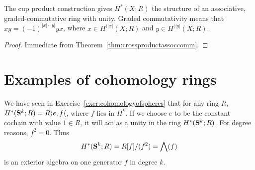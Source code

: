 \documentclass[a4paper,openany]{scrbook}
\begin{document}
\begin{corollary}\label{cor:cupproduct}
The cup product construction gives $H^*(X;R)$ the structure of an associative, graded-commutative ring with unity. Graded commutativity means that $xy=(-1)^{|x|\cdot|y|}yx$, where $x \in H^{(|x|}(X;R)$ and $y \in H^{(|y|}(X;R)$.
\end{corollary}
\begin{proof}
Immediate from Theorem~\ref{thm:crossproductassoccomm}.
\end{proof}

\section{Examples of cohomology rings}

\begin{example}\label{ex:cohomologyringofspheres}
We have seen in Exercise~\ref{exer:cohomologyofspheres} that for any ring $R$, $H^*(\S^k;R) = R\rangle e,f\langle$, where $f$ lies in $H^k$. If we choose $e$ to be the constant cochain with value $1 \in R$, it will act as a unity in the ring $H^*(\S^k;R)$. For degree reasons, $f^2=0$. Thus
\[
H^*(\S^k;R) = R[f]/(f^2) = \bigwedge(f)
\]
is an exterior algebra on one generator $f$ in degree $k$.
\end{example}
\end{document}
